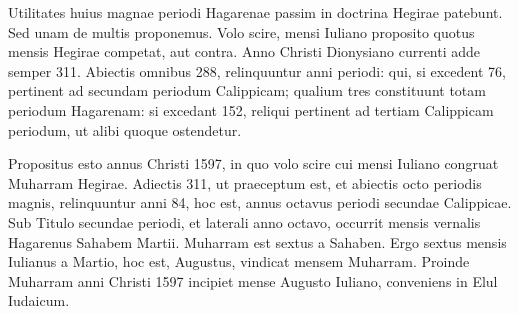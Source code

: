 

Utilitates huius magnae periodi Hagarenae passim in doctrina
Hegirae patebunt.
Sed unam de multis proponemus.
Volo scire,
mensi Iuliano proposito quotus mensis Hegirae competat, aut contra.
Anno Christi Dionysiano currenti adde semper 311.
Abiectis omnibus
288, relinquuntur anni periodi: qui, si excedent 76, pertinent ad
secundam periodum Calippicam; qualium tres constituunt totam periodum
Hagarenam: si excedant 152, reliqui pertinent ad tertiam Calippicam
periodum, ut alibi quoque ostendetur.

Propositus esto annus
Christi 1597, in quo volo scire cui mensi Iuliano congruat Muharram
Hegirae.
Adiectis 311, ut praeceptum est, et abiectis octo periodis magnis,
relinquuntur anni 84, hoc est, annus octavus periodi secundae %
Calippicae.
Sub Titulo secundae periodi, et laterali anno octavo, occurrit
mensis vernalis Hagarenus Sahabem  Martii.
Muharram est sextus
a Sahaben.
Ergo sextus mensis Iulianus a Martio, hoc est, Augustus, vindicat
mensem Muharram.
Proinde Muharram anni Christi 1597 incipiet
mense Augusto Iuliano, conveniens in Elul Iudaicum.


